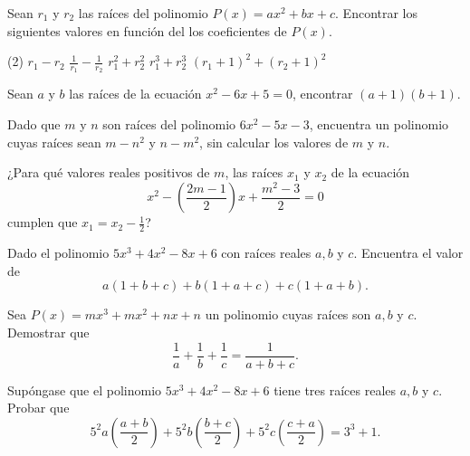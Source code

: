 \showLine
\begin{multicols}{2}

    \begin{exercise}
        Sean $r_1$ y $r_2$ las raíces del polinomio $P(x) = ax^2 + bx + c$.
        Encontrar los siguientes valores en función del los coeficientes de $P(x)$.
        \begin{tasks}[label=\arabic*.](2)
            \task $r_1 - r_2$
            \task $\frac{1}{r_1} - \frac{1}{r_2}$
            \task $r^2_1 + r^2_2$
            \task $r^3_1 + r^3_2$
            \task $(r_1 + 1)^2 + (r_2 + 1)^2$
        \end{tasks}
    \end{exercise}

    \begin{problem}
        Sean $a$ y $b$ las raíces de la ecuación $x^2 - 6x + 5 = 0$, encontrar $(a + 1)(b + 1)$.
    \end{problem}

    \begin{problem}
        Dado que $m$ y $n$ son raíces del polinomio $6x^2 - 5x - 3$, encuentra un polinomio cuyas raíces sean
        $m - n^2$ y $n - m^2$, sin calcular los valores de $m$ y $n$.
    \end{problem}

    \begin{problem}
        ¿Para qué valores reales positivos de $m$, las raíces $x_1$ y $x_2$ de la ecuación
        \[
            x^2 - \left( \frac{2m - 1}{2} \right)x  + \frac{m^2 - 3}{2} = 0
        \]
        cumplen que $x_1 = x_2 - \frac{1}{2}$?
    \end{problem}

    \begin{problem}
        Dado el polinomio $5x^3 + 4x^2 - 8x + 6$ con raíces reales $a, b$ y $c$.
        Encuentra el valor de
        \[
            a(1 + b + c) + b(1 + a + c) + c(1 + a + b).
        \]
    \end{problem}

    \begin{problem}
        Sea $P(x) = mx^3 + mx^2 + nx + n$ un polinomio cuyas raíces son $a, b$ y $c$.
        Demostrar que
        \[
            \frac{1}{a} + \frac{1}{b} + \frac{1}{c} = \frac{1}{a + b + c}.
        \]
    \end{problem}

    \begin{problem}
        Supóngase que el polinomio $5x^3 + 4x^2 - 8x + 6$ tiene tres raíces reales $a, b$ y $c$.
        Probar que
        \[
            5^2 a \left(\frac{a + b}{2}\right) + 5^2 b \left(\frac{b + c}{2}\right) + 5^2 c \left(\frac{c + a}{2}\right) = 3^3 + 1.
        \]
    \end{problem}
\end{multicols}